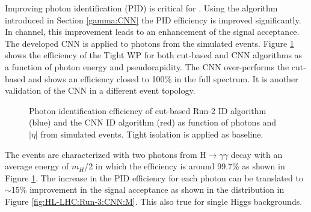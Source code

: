 Improving photon identification (PID) is critical for \HHyybb. Using the algorithm introduced in Section \ref{gamma:CNN} the PID efficiency is improved significantly. In \HHyybb channel, this improvement leads to an enhancement of the signal acceptance. The developed CNN is applied to photons from the \HHyybb simulated events.  Figure \ref{fig:HL-LHC:Run-3:CNN:E} shows the efficiency of the Tight WP for both cut-based and CNN algorithms as a function of photon energy and pseudorapidity. The CNN over-performs the cut-based and shows an efficiency closed to 100\% in the full \eT spectrum. It is another validation of the CNN in a different event topology.
\begin{figure}[htbp]
    \centering
    \begin{tcolorbox}[colback=black!5!white, colframe=white!75!black]
    \caption{Photon identification efficiency of cut-based Run-2 ID algorithm (blue) and the CNN ID algorithm (red) as function of photons \eT and $|\eta|$ from \HHyybb simulated events. Tight isolation is applied as baseline.}
    \label{fig:HL-LHC:Run-3:CNN:E}
    \end{tcolorbox}
\end{figure}

The \HHyybb events are characterized with two photons from H$\to\gamma\gamma$ decay with an average energy of $m_H$/2 in which the efficiency is around 99.7\% as shown in Figure \ref{fig:HL-LHC:Run-3:CNN:E}. The increase in the PID efficiency for each photon can be translated to $\sim$15\% improvement in the signal acceptance as shown in the \myy distribution in Figure \ref{fig:HL-LHC:Run-3:CNN:M}. This also true for single Higgs backgrounds.\\
 
